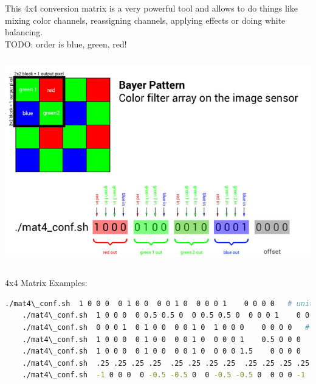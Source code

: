 This 4x4 conversion matrix is a very powerful tool and allows to do things like mixing color channels, reassigning channels, applying effects or doing white balancing.\\

TODO: order is blue, green, red! 

\begin{center}
\includegraphics[height=9cm]{images/700px-Mat4-conf-illustration-01}
\end{center}

4x4 Matrix Examples:

\begin{lstlisting}[language=bash,morekeywords=$,keywordstyle=\bfseries,frame=none,xleftmargin=.25in,belowskip=2em, aboveskip=2em]
    ./mat4\_conf.sh  1 0 0 0  0 1 0 0  0 0 1 0  0 0 0 1    0 0 0 0   # unity matrix but not optimal as both green channels are processed separately
    ./mat4\_conf.sh  1 0 0 0  0 0.5 0.5 0  0 0.5 0.5 0  0 0 0 1    0 0 0 0   # the two green channels inside each 2x2 pixel block are averaged and output on both green pixels
    ./mat4\_conf.sh  0 0 0 1  0 1 0 0  0 0 1 0  1 0 0 0    0 0 0 0   # red and blue are swapped
    ./mat4\_conf.sh  1 0 0 0  0 1 0 0  0 0 1 0  0 0 0 1    0.5 0 0 0    # red 50% brigther
    ./mat4\_conf.sh  1 0 0 0  0 1 0 0  0 0 1 0  0 0 0 1.5    0 0 0 0    # blue multiplied with factor 1.5
    ./mat4\_conf.sh  .25 .25 .25 .25  .25 .25 .25 .25  .25 .25 .25 .25  .25 .25 .25 .25    0 0 0 0    # black/white
    ./mat4\_conf.sh  -1 0 0 0  0 -0.5 -0.5 0  0 -0.5 -0.5 0  0 0 0 -1    1 1 1 1    # negative
\end{lstlisting}






